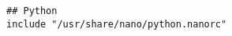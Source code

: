 \begin{framed}
\begin{verbatim}
## Python
include "/usr/share/nano/python.nanorc"

\end{verbatim}
\end{framed}